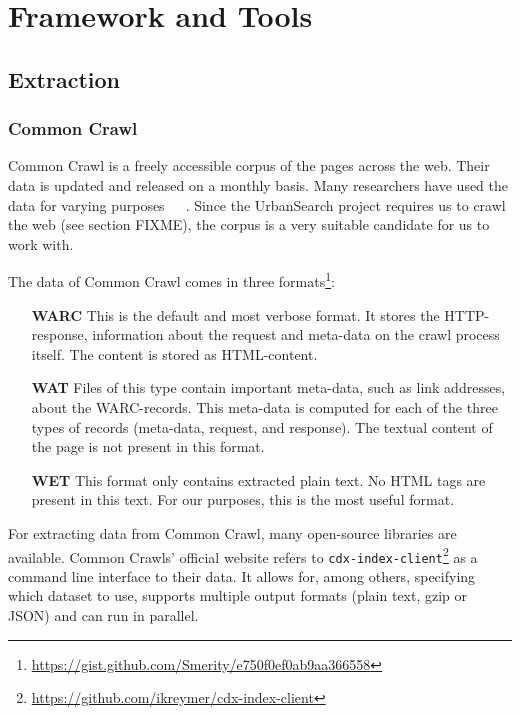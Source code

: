 \section{Framework and Tools}

\subsection{Extraction}

\subsubsection{Common Crawl}
Common Crawl \cite{commoncrawl} is a freely accessible corpus of the pages across the web. Their data is updated and released on a monthly basis. Many researchers have used the data for varying purposes~\cite{smith2013dirt}~\cite{muhleisen2012web}~\cite{singh2012wikilinks}. Since the UrbanSearch project requires us to crawl the web (see section {\color{Red} FIXME}), the corpus is a very suitable candidate for us to work with.

The data of Common Crawl comes in three formats\footnote{\url{https://gist.github.com/Smerity/e750f0ef0ab9aa366558}}: 
\begin{itemize}
\item[\textbf{WARC}] This is the default and most verbose format. It stores the HTTP-response, information about the request and meta-data on the crawl process itself. The content is stored as HTML-content.
\item[\textbf{WAT}] Files of this type contain important meta-data, such as link addresses, about the WARC-records. This meta-data is computed for each of the three types of records (meta-data, request, and response). The textual content of the page is not present in this format.
\item[\textbf{WET}] This format only contains extracted plain text. No HTML tags are present in this text. For our purposes, this is the most useful format.
\end{itemize}

For extracting data from Common Crawl, many open-source libraries are available. Common Crawls' official website refers to \texttt{cdx-index-client}\footnote{\url{https://github.com/ikreymer/cdx-index-client}} as a command line interface to their data. It allows for, among others, specifying which dataset to use, supports multiple output formats (plain text, gzip or JSON) and can run in parallel.

